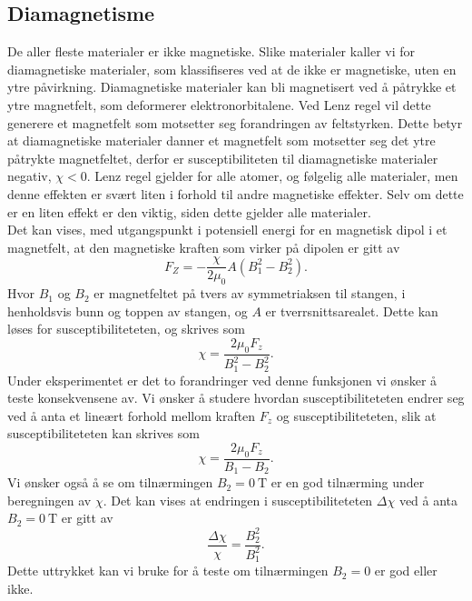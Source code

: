 \documentclass[%
 reprint,
nofootinbib,
aps,
]{revtex4-1}
\begin{document}
\subsection{Diamagnetisme}
De aller fleste materialer er ikke magnetiske. Slike materialer kaller vi for diamagnetiske materialer, som klassifiseres ved at de ikke er magnetiske, uten en ytre påvirkning. Diamagnetiske materialer kan bli magnetisert ved å påtrykke et ytre magnetfelt, som deformerer elektronorbitalene. Ved Lenz regel vil dette generere et magnetfelt som motsetter seg forandringen av feltstyrken. Dette betyr at diamagnetiske materialer danner et magnetfelt som motsetter seg det ytre påtrykte magnetfeltet, derfor er susceptibiliteten til diamagnetiske materialer negativ, $\chi < 0$. Lenz regel gjelder for alle atomer, og følgelig alle materialer, men denne effekten er svært liten i forhold til andre magnetiske effekter. Selv om dette er en liten effekt er den viktig, siden dette gjelder alle materialer.\\Det kan vises, med utgangspunkt i potensiell energi for en magnetisk dipol i et magnetfelt, at den magnetiske kraften som virker på dipolen er gitt av
\begin{equation}
  F_Z = -\frac{\chi}{2\mu_0}A\left(B_1^2 - B_2^2\right). \label{vismut}
\end{equation}
Hvor $B_1$ og $B_2$ er magnetfeltet på tvers av symmetriaksen til stangen, i henholdsvis bunn og toppen av stangen, og $A$ er tverrsnittsarealet. Dette kan løses for susceptibiliteteten, og skrives som
\begin{equation}
  \chi = \frac{2\mu_0F_z}{B_1^2 - B_2^2}.
\end{equation}
Under eksperimentet er det to forandringer ved denne funksjonen vi ønsker å teste konsekvensene av. Vi ønsker å studere hvordan susceptibiliteteten endrer seg ved å anta et lineært forhold mellom kraften $F_z$ og susceptibiliteteten, slik at susceptibiliteteten kan skrives som
\begin{equation}
  \chi = \frac{2\mu_0F_z}{B_1 - B_2}.\label{lin_chi}
\end{equation}
Vi ønsker også å se om tilnærmingen $B_2=\SI{0}{\tesla}$ er en god tilnærming under beregningen av $\chi$. Det kan vises at endringen i susceptibiliteteten $\Delta \chi$ ved å anta $B_2=\SI{0}{\tesla}$ er gitt av
\begin{equation}
  \frac{\Delta \chi}{\chi} = \frac{B_2^2}{B_1^2}. \label{test_chi}
\end{equation}
Dette uttrykket kan vi bruke for å teste om tilnærmingen $B_2=0$ er god eller ikke.
\end{document}

